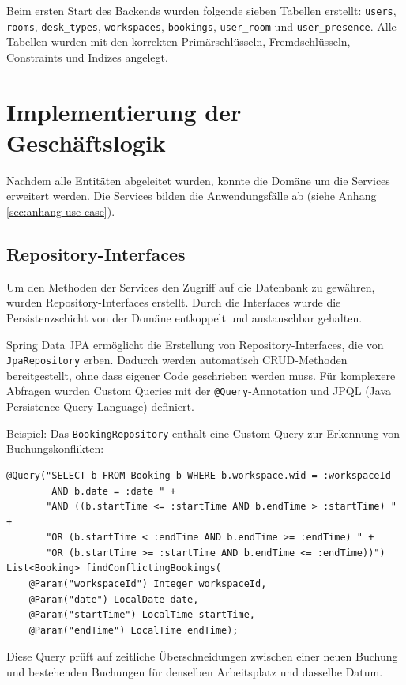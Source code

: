 \documentclass[11pt,a4paper]{report}
\begin{document}
Beim ersten Start des Backends wurden folgende sieben Tabellen erstellt: \texttt{users}, \texttt{rooms}, \texttt{desk\_types}, \texttt{workspaces}, \texttt{bookings}, \texttt{user\_room} und \texttt{user\_presence}. Alle Tabellen wurden mit den korrekten Primärschlüsseln, Fremdschlüsseln, Constraints und Indizes angelegt.

\section{Implementierung der Geschäftslogik}

Nachdem alle Entitäten abgeleitet wurden, konnte die Domäne um die Services erweitert werden. Die Services bilden die Anwendungsfälle ab (siehe Anhang \ref{sec:anhang-use-case}).

\subsection{Repository-Interfaces}

Um den Methoden der Services den Zugriff auf die Datenbank zu gewähren, wurden Repository-Interfaces erstellt. Durch die Interfaces wurde die Persistenzschicht von der Domäne entkoppelt und austauschbar gehalten.

Spring Data JPA ermöglicht die Erstellung von Repository-Interfaces, die von \texttt{JpaRepository} erben. Dadurch werden automatisch CRUD-Methoden bereitgestellt, ohne dass eigener Code geschrieben werden muss. Für komplexere Abfragen wurden Custom Queries mit der \texttt{@Query}-Annotation und JPQL (Java Persistence Query Language) definiert.

Beispiel: Das \texttt{BookingRepository} enthält eine Custom Query zur Erkennung von Buchungskonflikten:

\begin{verbatim}
@Query("SELECT b FROM Booking b WHERE b.workspace.wid = :workspaceId
        AND b.date = :date " +
       "AND ((b.startTime <= :startTime AND b.endTime > :startTime) " +
       "OR (b.startTime < :endTime AND b.endTime >= :endTime) " +
       "OR (b.startTime >= :startTime AND b.endTime <= :endTime))")
List<Booking> findConflictingBookings(
    @Param("workspaceId") Integer workspaceId,
    @Param("date") LocalDate date,
    @Param("startTime") LocalTime startTime,
    @Param("endTime") LocalTime endTime);
\end{verbatim}

Diese Query prüft auf zeitliche Überschneidungen zwischen einer neuen Buchung und bestehenden Buchungen für denselben Arbeitsplatz und dasselbe Datum.
\end{document}

